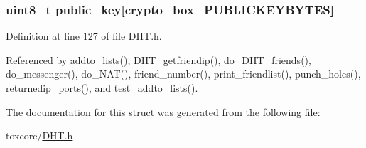 \hypertarget{struct_d_h_t___friend_aaa806bb1136fb3d4b5d8d8970b596ff7}{
\subsubsection[{public\+\_\+key}]{\setlength{\rightskip}{0pt plus 5cm}uint8\+\_\+t public\+\_\+key\mbox{[}crypto\+\_\+box\+\_\+\+P\+U\+B\+L\+I\+C\+K\+E\+Y\+B\+Y\+T\+E\+S\mbox{]}}}\label{struct_d_h_t___friend_aaa806bb1136fb3d4b5d8d8970b596ff7}


Definition at line 127 of file D\+H\+T.\+h.



Referenced by addto\+\_\+lists(), D\+H\+T\+\_\+getfriendip(), do\+\_\+\+D\+H\+T\+\_\+friends(), do\+\_\+messenger(), do\+\_\+\+N\+A\+T(), friend\+\_\+number(), print\+\_\+friendlist(), punch\+\_\+holes(), returnedip\+\_\+ports(), and test\+\_\+addto\+\_\+lists().



The documentation for this struct was generated from the following file\+:\begin{DoxyCompactItemize}
\item 
toxcore/\hyperlink{_d_h_t_8h}{D\+H\+T.\+h}\end{DoxyCompactItemize}
